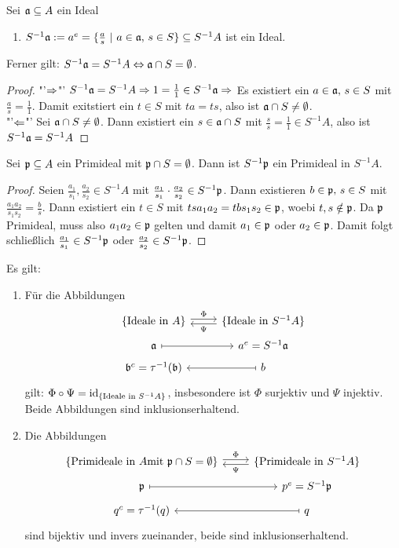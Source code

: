 \begin{bem+df}\label{12.1}
	Sei $\mathfrak{a}\subseteq A$ ein Ideal
	\begin{enumerate}
		\item[] $S^{-1}\a := a^e=\{\frac{a}{s}\ | \ a\in \a, \, s\in S\}\subseteq S^{-1}A$ ist ein Ideal.
	\end{enumerate}
	Ferner gilt: $S^{-1}\mathfrak{a}= S^{-1}A\Leftrightarrow \mathfrak{a}\cap S = \emptyset$. 
\end{bem+df}
\begin{proof}
	"'$\Rightarrow$"' $S^{-1}\mathfrak{a} = S^{-1}A \Rightarrow 1 = \frac{1}{1} \in S^{-1}\mathfrak{a} \Rightarrow $ Es existiert ein $a\in \mathfrak{a}, \, s\in S$ mit $\frac{a}{s} = \frac{1}{1}$. Damit exitstiert ein $t\in S$ mit $ta = ts$, also ist $\mathfrak{a} \cap S \neq \emptyset$.\\
	"'$\Leftarrow$"' Sei $\mathfrak{a}\cap S\neq \emptyset$. Dann existiert ein $s\in \mathfrak{a} \cap S$ mit $\frac{s}{s} = \frac{1}{1}\in S^{-1}A$, also ist $S^{-1}\mathfrak{a} = S^{-1}A$
\end{proof}
\begin{bem}\label{12.2}
	Sei $\mathfrak{p} \subseteq A$ ein Primideal mit $\mathfrak{p}\cap S=\emptyset$. Dann ist $S^{-1}\mathfrak{p}$ ein Primideal in $S^{-1} A$.
\end{bem}
\begin{proof}
	Seien $\frac{a_1}{s_1}, \frac{a_2}{s_2}\in S^{-1} A$ mit $\frac{a_1}{s_1} \cdot\frac{a_2}{s_2}\in S^{-1} \mathfrak{p}$. Dann existieren $b\in \mathfrak{p}, \, s\in S$ mit $\frac{a_1a_2}{s_1s_2} = \frac{b}{s}$. Dann existiert ein $t\in S$ mit $tsa_1a_2 = tbs_1s_2 \in \mathfrak{p}$, woebi $t,s\notin \mathfrak{p}$. Da $\mathfrak{p}$ Primideal, muss also $a_1a_2\in \mathfrak{p}$ gelten und damit $a_1\in \mathfrak{p}$ oder $a_2\in \mathfrak{p}$. Damit folgt schließlich $\frac{a_1}{s_1}\in S^{-1} \mathfrak{p}$ oder $\frac{a_2}{s_2}\in S^{-1}\mathfrak{p}$.
\end{proof}
\begin{bem}\label{12.3}
	Es gilt:
	\begin{enumerate}[label=\alph*)]
		\item Für die Abbildungen
		$$\begin{tikzcd}[row sep = tiny]
		\{\text{Ideale in } A\} \arrow[yshift = 0.5ex]{r}{\Phi} & \{\text{Ideale in } S^{-1}A\} \arrow[yshift = -0.5ex]{l}{\Psi} \\
		\a \arrow[mapsto]{r}& a^e=S^{-1} \a \\
		\b^c=\tau^{-1}(\b) & b\arrow[mapsto]{l}
		\end{tikzcd}$$
		gilt: $\Phi \circ \Psi = \operatorname{id}_{\{\text{Ideale in } S^{-1}A\}}$, insbesondere ist $\Phi$ surjektiv und $\Psi $ injektiv. Beide Abbildungen sind inklusionserhaltend.
		\item Die Abbildungen
		$$\begin{tikzcd}[row sep = tiny]
		\{\text{Primideale in } A \text{mit } \p\cap S = \emptyset\} \arrow[yshift = 0.5ex]{r}{\Phi} & \{\text{Primideale in } S^{-1}A\} \arrow[yshift = -0.5ex]{l}{\Psi} \\
		\p \arrow[mapsto]{r}& p^e=S^{-1} \p \\
		q^c=\tau^{-1}(q) & q\arrow[mapsto]{l}
		\end{tikzcd}$$
		sind bijektiv und invers zueinander, beide sind inklusionserhaltend.
	\end{enumerate}
\end{bem}
